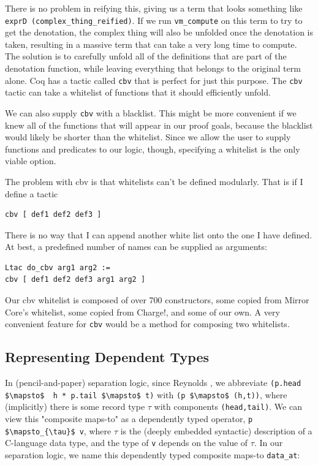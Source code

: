 \documentclass{puthesis}
\begin{document}
There is no problem in reifying this, giving us a term that looks
something like \lstinline|exprD (complex_thing_reified)|. If we run
\lstinline|vm_compute| on this term to try to get the denotation, the
complex thing will also be unfolded once the denotation is taken,
resulting in a massive term that can take a very long time to
compute. The solution is to carefully unfold all of the definitions
that are part of the denotation function, while leaving everything
that belongs to the original term alone. Coq has a tactic called
\lstinline|cbv| that is perfect for just this purpose. The
\lstinline|cbv| tactic can take a whitelist of functions that it
should efficiently unfold.

We can also supply \lstinline|cbv| with a blacklist. This might be
more convenient if we knew all of the functions that will appear in
our proof goals, because the blacklist would likely be shorter than
the whitelist. Since we allow the user to supply functions and
predicates to our logic, though, specifying a whitelist is the only
viable option.

The problem with cbv is that whitelists can't be defined
modularly. That is if I define a tactic 

\begin{lstlisting}
cbv [ def1 def2 def3 ]
\end{lstlisting}

There is no way that I can append another white list onto the one I have
defined. At best, a predefined number of names can be supplied as
arguments:

\begin{lstlisting}
Ltac do_cbv arg1 arg2 :=
cbv [ def1 def2 def3 arg1 arg2 ]
\end{lstlisting}

Our cbv whitelist is composed of over 700 constructors, some
copied from Mirror Core's whitelist, some copied from Charge!, and
some of our own. A very convenient feature for \lstinline|cbv| would
be a method for composing two whitelists.

\subsection{Representing Dependent Types}
\label{sub:dependent}


In (pencil-and-paper) separation logic, since Reynolds
\cite{reynolds02}, we abbreviate 
\lstinline|(p.head $\mapsto$  h * p.tail $\mapsto$ t)| with 
\lstinline|(p $\mapsto$ (h,t))|, where (implicitly) there is some record type $\tau$ with
components \lstinline|(head,tail)|.  We can view this "composite maps-to" as a
dependently typed operator, \lstinline|p $\mapsto_{\tau}$ v|, where $\tau$ is the (deeply
embedded syntactic) description of a C-language data type, and the
type of \lstinline|v| depends on the value of $\tau$.  In our separation logic, we
name this dependently typed composite maps-to \lstinline|data_at|:
\end{document}
